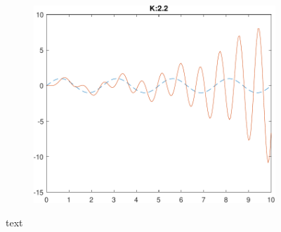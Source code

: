 \begin{figure}
\begin{subfigure}{0.33\linewidth}
		\caption{}
	\end{subfigure}\hfill
	\begin{subfigure}{0.33\linewidth}
		\centering
		\includegraphics[width=0.95\linewidth]{../code/pupillary/sine/figs/result_gain_2.2}
		\caption{}
	\end{subfigure}\hfill
	\caption{text}
\end{figure}

